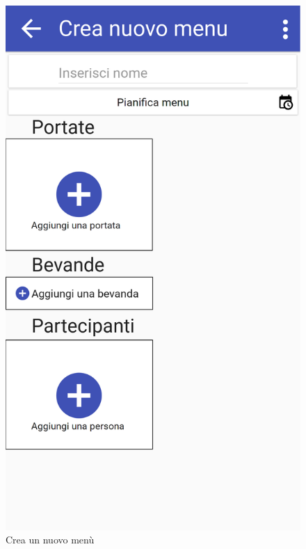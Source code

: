 \begin{figure}[H]
	\begin{minipage}{.49\textwidth}
		\includegraphics[width=\textwidth]{img/wireframe/crea_nuovo_menu.png}
		\caption{Crea un nuovo menù}
	\end{minipage}
	\hfill
	\begin{minipage}{.49\textwidth}

\end{minipage}
\end{figure}
